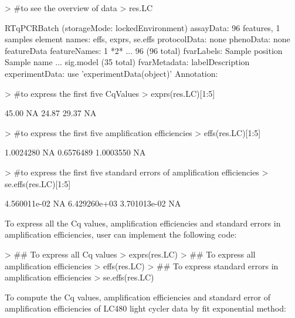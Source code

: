\documentclass[11pt]{article}
\begin{document}
\begin{Schunk}
\begin{Sinput}
> #to see the overview of data
> res.LC 
\end{Sinput}
\begin{Soutput}
RTqPCRBatch (storageMode: lockedEnvironment)
assayData: 96 features, 1 samples 
  element names: effs, exprs, se.effs 
protocolData: none
phenoData: none
featureData
  featureNames: 1 *2* ... 96 (96 total)
  fvarLabels: Sample position Sample name ... sig.model (35 total)
  fvarMetadata: labelDescription
experimentData: use 'experimentData(object)'
Annotation:  
\end{Soutput}
\begin{Sinput}
> #to express the first five CqValues
> exprs(res.LC)[1:5]
\end{Sinput}
\begin{Soutput}
[1] 45.00    NA 24.87 29.37    NA
\end{Soutput}
\begin{Sinput}
> #to express the first five amplification efficiencies
> effs(res.LC)[1:5]
\end{Sinput}
\begin{Soutput}
[1] 1.0024280        NA 0.6576489 1.0003550        NA
\end{Soutput}
\begin{Sinput}
> #to express the first five standard errors of amplification efficiencies
> se.effs(res.LC)[1:5]
\end{Sinput}
\begin{Soutput}
[1] 4.560011e-02           NA 6.429260e+03 3.701013e-02           NA
\end{Soutput}
\end{Schunk}

To express all the Cq values, amplification efficiencies and standard errors in amplification efficiencies, user can implement the following code:

\begin{Schunk}
\begin{Sinput}
> ## To express all Cq values
> exprs(res.LC) 
> ## To express all amplification efficiencies
> effs(res.LC)
> ## To express standard errors in amplification efficiencies
> se.effs(res.LC)
\end{Sinput}
\end{Schunk}

To compute the Cq values, amplification efficiencies and standard error of amplification efficiencies of LC480 light cycler data by fit exponential method:
\end{document}
